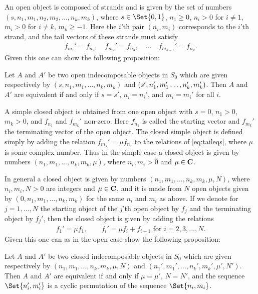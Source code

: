 An open object is composed of strands and is given by the set of numbers $(s,n_1,m_1,n_2,m_2,\dotsc,n_k,m_k)$, where $s\in \Set{0,1}$,  $n_1\geq 0$, $n_i>0$ for $i\neq 1$, $m_i>0$ for $i\neq k$, $m_k\geq -1$. Here the $i$'th pair $(n_i,m_i)$ corresponds to the $i$'th strand, and the tail vectors of these strands must satisfy
\begin{align}\label{eq:taileqs}
  f_{m_1}' = f_{n_2}, \quad f_{m_2}' = f_{n_3}, \quad \dotsc \quad f_{m_{k-1}}' = f_{n_k}.
\end{align}
Given this one can show the following proposition:
\begin{proposition}
  Let $A$ and $A'$ be two open indecomposable objects in $S_0$ which are given respectively by $(s,n_1,m_1,\dotsc,n_k,m_k)$ and $(s',n_1',m_1'\dotsc,\\ n_k',m_k')$. Then $A$ and $A'$ are equivalent if and only if $s=s'$, $n_i=n_i'$, and $m_i=m_i'$ for all $i$.
\end{proposition}

A simple closed object is obtained from one open object with $s=0$, $n_1>0$, $m_k>0$, and $f_{n_1}$ and $f_{m_k}'$ non-zero. Here $f_{n_1}$ is called the starting vector and $f_{m_k}'$ the terminating vector of the open object. The closed simple object is defined simply by adding the relation $f_{m_k}'=\mu f_{n_1}$ to the relations of \cref{eq:taileqs}, where $\mu$ is some complex number. Thus in the simple case a closed object is given by numbers $(n_1,m_1,\dotsc,n_k,m_k,\mu)$, where $n_i,m_i>0$ and $\mu\in\mathbf{C}$.

In general a closed object is given by numbers $(n_1,m_1,\dotsc,n_k,m_k,\mu,N)$, where $n_i,m_i,N>0$ are integers and $\mu\in\mathbf{C}$, and it is made from $N$ open objects given by $(0,n_1,m_1,\dotsc,n_k,m_k)$ for the same $n_i$ and $m_i$ as above. If we denote for $j=1,\dotsc,N$ the starting object of the $j$'th open object by $f_j$ and the terminating object by $f_j'$, then the closed object is given by adding the relations 
\begin{align*}
  f_1' = \mu f_1, \qquad f_i' = \mu f_i + f_{i-1} \mbox{ for }i=2,3,\dotsc,N.
\end{align*}
Given this one can as in the open case show the following proposition:
\begin{proposition}
  Let $A$ and $A'$ be two closed indecomposable objects in $S_0$ which are given respectively by $(n_1,m_1,\dotsc,n_k,m_k,\mu,N)$ and $(n_1',m_1',\dotsc,n_k',m_k',\mu',N')$. Then $A$ and $A'$ are equivalent if and only if $\mu=\mu'$, $N=N'$, and the sequence $\Set{n_i',m_i'}$ is a cyclic permutation of the sequence $\Set{n_i,m_i}$. 
\end{proposition}

